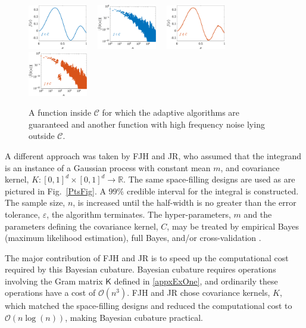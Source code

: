 \documentclass[11pt]{NSFamsart}
\newcommand{\reals}{{\mathbb{R}}}
\newcommand{\mK}{\mathsf{K}}
\newcommand{\cc}{\mathcal{C}}
\newcommand{\Order}{\mathcal{O}}
\begin{document}
\begin{figure}[h]
	\centering
	\includegraphics[width = 0.23\textwidth] 
	{ProgramsImages/FunctionWalshFourierCoeffDecay.eps} \ \ 
	\includegraphics[width = 0.23\textwidth] 
	{ProgramsImages/WalshFourierCoeffDecay128.eps} \ \ 
	\includegraphics[width = 0.23\textwidth] 
	{ProgramsImages/FilteredFunctionWalshFourierCoeffDecay.eps} \ \ 
	\includegraphics[width = 0.23\textwidth] 
	{ProgramsImages/WalshFourierCoeffDecayFilter.eps}
	\caption{A function inside $\cc$ for which the adaptive algorithms are guaranteed and another function with high frequency noise lying outside $\cc$.
	\label{GoodBadWalshFig}}
\end{figure}

A different approach was taken by FJH and JR, who assumed that the integrand is an instance of a Gaussian process with constant mean $m$, and covariance kernel, $K:[0,1]^d \times [0,1]^d \to \reals$.  The same space-filling designs are used as are pictured in Fig.\ \ref{PtsFig}.  A $99\%$ credible interval for the integral is constructed.  The sample size, $n$, is increased until the half-width is no greater than the error tolerance, $\varepsilon$, the algorithm terminates.  The hyper-parameters, $m$ and the parameters defining the covariance kernel, $C$, may be treated by empirical Bayes (maximum likelihood estimation), full Bayes, and/or cross-validation \cite{RatHic19a}. 

The major contribution of FJH and JR is to speed up the computational cost required by this Bayesian cubature.  Bayesian cubature requires operations
involving the Gram matrix $\mK$ defined in \eqref{appxExOne}, and ordinarily these operations  have a cost of
$\Order(n^3)$.  FJH and JR chose covariance kernels, $K$, which matched the space-filling designs and reduced the computational cost to $\Order(n 
\log(n))$, making Bayesian cubature practical.
\end{document}
